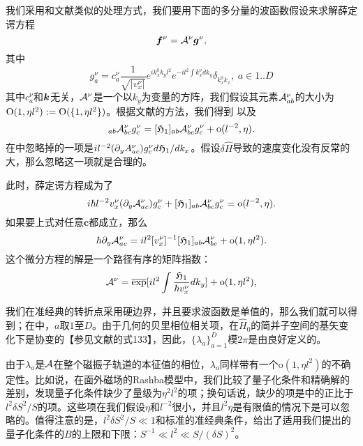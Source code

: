 我们采用和文献类似的处理方式，我们要用下面的多分量的波函数假设来求解薛定谔方程
\begin{equation}
\boldsymbol{f}^\nu={\cal A}^\nu\boldsymbol{g}^\nu,\label{wkb-wf}
\end{equation}
其中
\begin{equation}
g_a^\nu=c_{a}^\nu\frac{1}{\sqrt{|v_x^\nu|}}e^{ik^{0}_{x}k_{y}l^{2}}e^{-il^{2}\int k_{x}^\nu dk_{y}}\delta_{k^{0}_{x}k_{x}},~a\in{1..D}
\end{equation}
其中$c_a^\nu$和$\boldsymbol{k}$无关，${\cal A}^\nu$是一个以$k_y$为变量的方阵，我们假设其元素${\cal A}_{ab}^\nu$的大小为$\text{O}(1, \eta l^2):=\text{O}(\{1,\eta l^2\})$。根据文献的方法，我们得到
以及
\begin{equation}
[\effH_{1}(\bK)]_{ab}\A_{bc}^\nu g_{c}^\nu=[\effH_{1}]_{ab}\A_{bc}^\nu g_{c}^\nu+\text{o}(l^{-2}, \eta).\label{effH1onA}
\end{equation}
在中忽略掉的一项是$i l^{-2}(\partial_{y}A_{ac}^\nu)g_{c}^\nu d\mathfrak{H}_1/dk_x$。假设$\delta\hat{H}$导致的速度变化没有反常的大，那么忽略这一项就是合理的。

此时，薛定谔方程成为了 
\begin{equation}
i\hbar l^{-2} v_{x}^\nu (\partial_{y}{\cal A}_{ac}^\nu)  g_{c}^\nu+[\mathfrak{H}_{1}]_{ab}{\cal A}_{bc}^\nu g_{c}^\nu=\text{o}(l^{-2}, \eta).
\end{equation}
如果要上式对任意$\mathbf{c}$都成立，那么
\begin{equation}
\hbar\partial_{y}{\cal A}_{ac}^\nu=il^{2}[v_{x}^\nu]^{-1}[\mathfrak{H}_{1}]_{ab}{\cal A}_{bc}^\nu+{\text{o}(1, \eta l^2)}.
\end{equation}
这个微分方程的解是一个路径有序的矩阵指数：
\begin{equation}
{\cal A}^\nu=\overline{\exp}[il^{2}\int\frac{\mathfrak{H}_{1}}{\hbar v_{x}^\nu}dk_{y}]+{\text{o}(1, \eta l^2)},
\end{equation}

我们在准经典的转折点采用硬边界，并且要求波函数是单值的\cite{100p}，那么我们就可以得到；在中，$a$取$1$至$D$。由于几何的贝里相位相关项，在$\hat{H}_0$的简并子空间的基矢变化下是协变的【参见文献的式133】，因此，$\{\lambda_a\}_{a=1}^D$模$2\pi$是由良好定义的。

由于$\lambda_a$是${\cal A}$在整个磁振子轨道的本征值的相位，$\lambda_a$同样带有一个$\text{o}(1, \eta l^2)$的不确定性。比如说，在面外磁场的Rashba模型中，我们比较了量子化条件和精确解的差别，发现量子化条件缺少了量级为$\eta^2 l^2$的项；换句话说，缺少的项是中的正比于$l^2\delta S^2/S$的项。这些项在我们假设$\eta$和$l^{-2}$很小，并且$l^2\eta$是有限值的情况下是可以忽略的。值得注意的是，$l^2\delta S^2/S\ll 1$和标准的准经典条件，给出了适用我们提出的量子化条件的$B$的上限和下限：$S^{-1} \ll l^2 \ll S/(\delta S)^2$。


